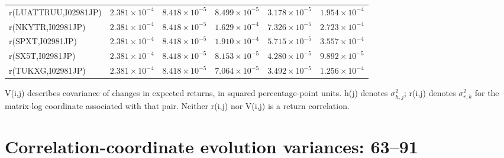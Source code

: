 \documentclass[10pt,a4paper]{article}
\begin{document}
\begin{tabular*}{\linewidth}{@{\extracolsep{\fill}}lrrrrr@{}}
r(LUATTRUU,I02981JP) & $2.381\times10^{-4}$ & $8.418\times10^{-5}$ & $8.499\times10^{-5}$ & $3.178\times10^{-5}$ & $1.954\times10^{-4}$ \\
r(NKYTR,I02981JP) & $2.381\times10^{-4}$ & $8.418\times10^{-5}$ & $1.629\times10^{-4}$ & $7.326\times10^{-5}$ & $2.723\times10^{-4}$ \\
r(SPXT,I02981JP) & $2.381\times10^{-4}$ & $8.418\times10^{-5}$ & $1.910\times10^{-4}$ & $5.715\times10^{-5}$ & $3.557\times10^{-4}$ \\
r(SX5T,I02981JP) & $2.381\times10^{-4}$ & $8.418\times10^{-5}$ & $8.153\times10^{-5}$ & $4.280\times10^{-5}$ & $9.892\times10^{-5}$ \\
r(TUKXG,I02981JP) & $2.381\times10^{-4}$ & $8.418\times10^{-5}$ & $7.064\times10^{-5}$ & $3.492\times10^{-5}$ & $1.256\times10^{-4}$ \\
\bottomrule
\end{tabular*}\endgroup
\par\medskip\footnotesize
V(i,j) describes covariance of changes in expected returns, in squared percentage-point units.
h(j) denotes $\sigma_{h,j}^{2}$; r(i,j) denotes $\sigma_{r,k}^{2}$ for the matrix-log coordinate
associated with that pair. Neither r(i,j) nor V(i,j) is a return correlation.

\clearpage\section*{Correlation-coordinate evolution variances: 63--91}
\end{document}
